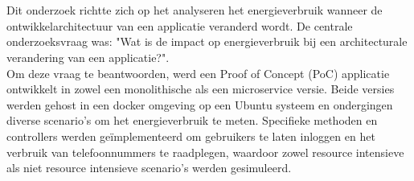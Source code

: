 
%
%
%
%
%

%



\chapter*{}
Dit onderzoek richtte zich op het analyseren het energieverbruik wanneer de ontwikkelarchitectuur van een applicatie veranderd wordt. De centrale onderzoeksvraag was: "Wat is de impact op energieverbruik bij een architecturale verandering van een applicatie?".\\

Om deze vraag te beantwoorden, werd een Proof of Concept (PoC) applicatie ontwikkelt in zowel een monolithische als een microservice versie. Beide versies werden gehost in een docker omgeving op een Ubuntu systeem en ondergingen diverse scenario's om het energieverbruik te meten. Specifieke methoden en controllers werden geïmplementeerd om gebruikers te laten inloggen en het verbruik van telefoonnummers te raadplegen, waardoor zowel resource intensieve als niet resource intensieve scenario’s werden gesimuleerd.\\


